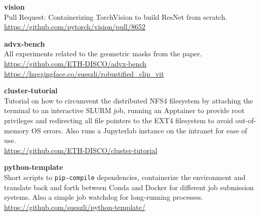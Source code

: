 \documentclass[a4paper, oneside]{discothesis}
\newcommand{\linebreaks}{\vspace*{0.5em}}
\begin{document}
\linebreaks

\begin{samepage}
	\begin{spacing}{1}
		\textbf{vision} \\
		Pull Request: Containerizing TorchVision to build ResNet from scratch. \\
		\url{https://github.com/pytorch/vision/pull/8652}
	\end{spacing}
\end{samepage}

\linebreaks

\begin{samepage}
	\begin{spacing}{1}
		\textbf{advx-bench} \\
		All experiments related to the geometric masks from the paper. \\
		\url{https://github.com/ETH-DISCO/advx-bench} \\
		\url{https://huggingface.co/sueszli/robustified_clip_vit}
	\end{spacing}
\end{samepage}

\linebreaks

\begin{samepage}
	\begin{spacing}{1}
		\textbf{cluster-tutorial} \\
		Tutorial on how to circumvent the distributed NFS4 filesystem by attaching the terminal to an interactive SLURM job, running an Apptainer to provide root privileges and redirecting all file pointers to the EXT4 filesystem to avoid out-of-memory OS errors. Also runs a Jupyterlab instance on the intranet for ease of use. \\
		\url{https://github.com/ETH-DISCO/cluster-tutorial}
	\end{spacing}
\end{samepage}

\linebreaks

\begin{samepage}
	\begin{spacing}{1}
		\textbf{python-template} \\
		Short scripts to \texttt{pip-compile} dependencies, containerize the environment and translate back and forth between Conda and Docker for different job submission systems. Also a simple job watchdog for long-running processes. \\ 
		\url{https://github.com/sueszli/python-template/}
	\end{spacing}
\end{samepage}
	
\end{document}
